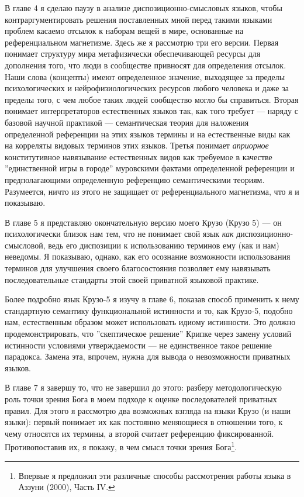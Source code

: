 \documentclass[11pt]{book}
\begin{document}
В главе 4 я сделаю паузу в анализе диспозиционно-смысловых языков, чтобы контраргументировать решения поставленных мной перед такими языками проблем касаемо отсылок к наборам вещей в мире, основанные на референциальном магнетизме. Здесь же я рассмотрю три его версии. Первая понимает структуру мира метафизически обеспечивающей ресурсы для дополнения того, что люди в сообществе привносят для определения отсылок. Наши слова (концепты) имеют определенное значение, выходящее за пределы психологических и нейрофизиологических ресурсов любого человека и даже за пределы того, с чем любое таких людей сообщество могло бы справиться. Вторая понимает интерпретаторов естественных языков так, как того требует --- наряду с базовой научной практикой --- семантическая теория для наложения определенной референции на этих языков термины и на естественные виды как на корреляты видовых терминов этих языков. Третья понимает \textit{априорное} конститутивное навязывание естественных видов как требуемое в качестве ''единственной игры в городе'' муровскими фактами определенной референции и предполагающими определенную референцию семантическими теориям. Разумеется, ничто из этого не защищает от референциального магнетизма, что я и показываю.

В главе 5 я представляю окончательную версию моего Крузо (Крузо 5) --- он психологически близок нам тем, что не понимает свой язык \textit{как} диспозиционно-смысловой, ведь его диспозиции к использованию терминов ему (как и нам) неведомы. Я показываю, однако, как его осознание возможности использования терминов для улучшения своего благосостояния позволяет ему навязывать последовательные стандарты этой своей приватной языковой практике.

Более подробно язык Крузо-5 я изучу в главе 6, показав способ применить к нему стандартную семантику функциональной истинности и то, как Крузо-5, подобно нам, естественным образом может использовать идиому истинности. Это должно продемонстрировать, что ''скептическое решение'' Крипке через замену условий истинности условиями утверждаемости --- не единственное такое решение парадокса. Замена эта, впрочем, нужна для вывода о невозможности приватных языков.

В главе 7 я завершу то, что не завершил до этого: разберу методологическую роль точки зрения Бога в моем подходе к оценке последователей приватных правил. Для этого я рассмотрю два возможных взгляда на языки Крузо (и наши языки): первый понимает их как постоянно меняющиеся в отношении того, к чему относятся их термины, а второй считает референцию фиксированной. Противопоставив их, я покажу, в чем смысл точки зрения Бога\footnote{Впервые я предложил эти различные способы рассмотрения работы языка в Аззуни (2000), Часть IV.}.
\end{document}
